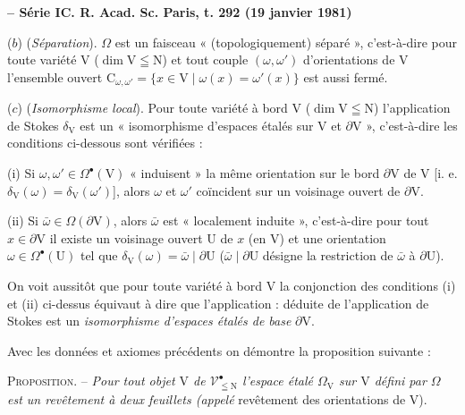 \textbf{ -- Série I}\hfill\textbf{C. R. Acad. Sc. Paris, t. 292 (19 janvier 1981)}

($b$) (\textit{Séparation}). $\Omega$ est un faisceau « (topologiquement) séparé », c'est-à-dire pour toute variété $\mathrm V$ ($\dim\mathrm V\leqq\mathrm N$) et tout couple $(\omega,\omega')$ d'orientations de $\mathrm V$ l'ensemble ouvert $\mathrm C_{\omega,\omega'}=\{x\in\mathrm V\mid\omega(x)=\omega'(x)\}$ est aussi fermé.

($c$) (\textit{Isomorphisme local}). Pour toute variété à bord $\mathrm V$ ($\dim\mathrm V\leqq\mathrm N$) l'application de Stokes $\delta_{\mathrm V}$ est un « isomorphisme d'espaces étalés sur $\mathrm V$ et $\partial\mathrm V$ », c'est-à-dire les conditions ci-dessous sont vérifiées :

(i) Si $\omega,\omega'\in\Omega^\bullet(\mathrm V)$ « induisent » la même orientation sur le bord $\partial\mathrm V$ de $\mathrm V$ [i. e. $\delta_{\mathrm V}(\omega)=\delta_{\mathrm V}(\omega')$], alors $\omega$ et $\omega'$ coïncident sur un voisinage ouvert de $\partial\mathrm V$.

(ii) Si $\bar\omega\in\Omega(\partial\mathrm V)$, alors $\bar\omega$ est « localement induite », c'est-à-dire pour tout $x\in\partial\mathrm V$ il existe un voisinage ouvert $\mathrm U$ de $x$ (en $\mathrm V$) et une orientation $\omega\in\Omega^\bullet(\mathrm U)$ tel que $\delta_{\mathrm V}(\omega)=\bar\omega\mid\partial\mathrm U$ ($\bar\omega\mid\partial\mathrm U$ désigne la restriction de $\bar\omega$ à $\partial\mathrm U$).

On voit aussitôt que pour toute variété à bord $\mathrm V$ la conjonction des conditions (i) et (ii) ci-dessus équivaut à dire que l'application :
déduite de l'application de Stokes est un \textit{isomorphisme d'espaces étalés de base} $\partial\mathrm V$.

Avec les données et axiomes précédents on démontre la proposition suivante :

\textsc{Proposition}. -- \textit{Pour tout objet $\mathrm V$ de $\mathcal V^\bullet_{\leqq\mathrm N}$ l'espace étalé $\Omega_{\mathrm V}$ sur $\mathrm V$ défini par $\Omega$ est un revêtement à deux feuillets (appelé} revêtement des orientations de $\mathrm V$).

